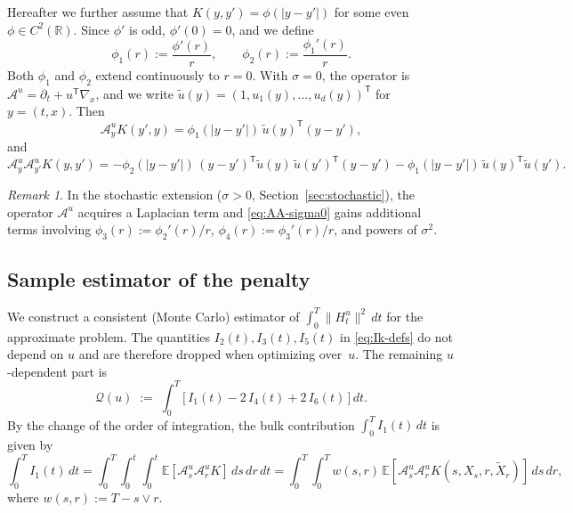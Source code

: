 \documentclass[11pt,leqno]{article}
\theoremstyle{plain}
\theoremstyle{remark}
\newtheorem*{rem}{Remark}
\theoremstyle{definition}
\numberwithin{equation}{section}
\numberwithin{figure}{section}
\numberwithin{table}{section}
\begin{document}

Hereafter we further assume that $K(y,y')=\phi(|y-y'|)$ for some even $\phi\in C^2(\mathbb{R})$.
Since $\phi'$ is odd, $\phi'(0)=0$, and we define
\[
 \phi_1(r):=\frac{\phi'(r)}{r}, \qquad
 \phi_2(r):=\frac{\phi_1'(r)}{r}.
\]
Both $\phi_1$ and $\phi_2$ extend continuously to $r=0$.
With $\sigma=0$, the operator is $\mathcal{A}^u=\partial_t + u^{\mathsf{T}}\nabla_x$, and we write $\tilde{u}(y)=(1,u_1(y),\ldots,u_d(y))^{\mathsf{T}}$ for $y=(t,x)$. Then
\begin{equation}\label{eq:AK-sigma0}
 \mathcal{A}^u_y K(y',y) = \phi_1(|y-y'|)\,\tilde{u}(y)^{\mathsf{T}}(y-y'),
\end{equation}
and
\begin{equation}\label{eq:AA-sigma0}
 \mathcal{A}^u_y\mathcal{A}^u_{y'}K(y,y')
 = -\phi_2(|y-y'|)\,(y-y')^{\mathsf{T}}\tilde{u}(y)\,\tilde{u}(y')^{\mathsf{T}}(y-y')
   -\phi_1(|y-y'|)\,\tilde{u}(y)^{\mathsf{T}}\tilde{u}(y').
\end{equation}

\begin{rem}
In the stochastic extension ($\sigma>0$, Section~\ref{sec:stochastic}),
the operator $\mathcal{A}^u$ acquires a Laplacian term and
\eqref{eq:AA-sigma0} gains additional terms involving
$\phi_3(r):=\phi_2'(r)/r$, $\phi_4(r):=\phi_3'(r)/r$, and powers of $\sigma^2$.
\end{rem}

\subsection{Sample estimator of the penalty}
\label{sec:U-statistic}

We construct a consistent (Monte Carlo) estimator of $\int_0^T\|H_t^u\|^2\,dt$ for the approximate problem.
The quantities $I_2(t), I_3(t), I_5(t)$ in \eqref{eq:Ik-defs} do not
depend on $u$ and are therefore dropped when optimizing over~$u$.
The remaining $u$-dependent part is
\begin{equation}\label{eq:Jhat-population}
 \mathcal{Q}(u) \;:=\; \int_0^T\bigl[\,I_1(t) - 2\,I_4(t) + 2\,I_6(t)\,\bigr]\,dt.
\end{equation}
By the change of the order of integration, the bulk contribution $\int_0^T I_1(t)\,dt$ is given by 
\[
 \int_0^T I_1(t)\,dt = \int_0^T\!\!\int_0^t\!\!\int_0^t \mathbb{E}[\mathcal{A}^u_s\mathcal{A}^u_r K]\,ds\,dr\,dt
 = \int_0^T\!\!\int_0^T w(s,r)\,\mathbb{E}[\mathcal{A}^u_s\mathcal{A}^u_r K(s,X_s,r,\tilde{X}_r)]\,ds\,dr,
\]
where $w(s,r):=T - s\vee r$.
\end{document}
